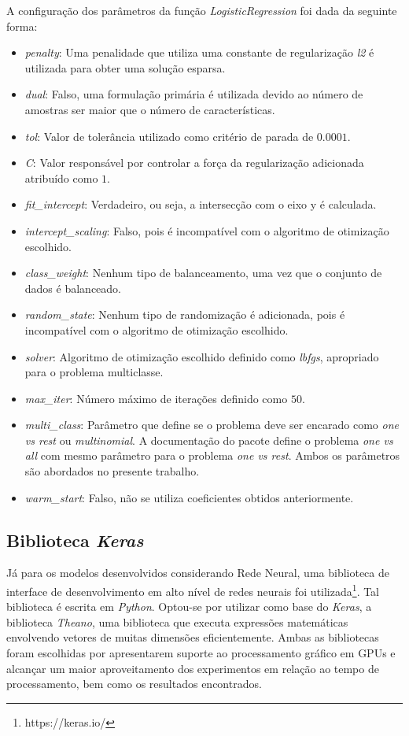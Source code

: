 \documentclass[conference]{IEEEtran}
\begin{document}
A configuração dos parâmetros da função \emph{LogisticRegression} foi dada da seguinte forma:
\begin{itemize}
	\item \textit{penalty}: Uma penalidade que utiliza uma constante de regularização \textit{l2} é utilizada para obter uma solução esparsa.
	\item \textit{dual}: Falso, uma formulação primária é utilizada devido ao número de amostras ser maior que o número de características.
	\item \textit{tol}: Valor de tolerância utilizado como critério de parada de $0.0001$.
	\item \textit{C}: Valor responsável por controlar a força da regularização adicionada atribuído como $1$.
	\item \textit{fit\_intercept}: Verdadeiro, ou seja, a intersecção com o eixo y é calculada.
	\item \textit{intercept\_scaling}: Falso, pois é incompatível com o algoritmo de otimização escolhido.
	\item \textit{class\_weight}: Nenhum tipo de balanceamento, uma vez que o conjunto de dados é balanceado.
	\item \textit{random\_state}: Nenhum tipo de randomização é adicionada, pois é incompatível com o algoritmo de otimização escolhido.
	\item \textit{solver}: Algoritmo de otimização escolhido definido como \textit{lbfgs}, apropriado para o problema multiclasse.
	\item \textit{max\_iter}: Número máximo de iterações definido como $50$.
	\item \textit{multi\_class}: Parâmetro que define se o problema deve ser encarado como \textit{one vs rest} ou \textit{multinomial}. A documentação do pacote define o problema \textit{one vs all} com mesmo parâmetro para o problema \textit{one vs rest}. Ambos os parâmetros são abordados no presente trabalho. 
	\item \textit{warm\_start}: Falso, não se utiliza coeficientes obtidos anteriormente.
\end{itemize}


\subsection{Biblioteca \textit{Keras}} \label{sec:bib}

Já para os modelos desenvolvidos considerando Rede Neural, uma biblioteca de interface de desenvolvimento em alto nível de redes neurais foi utilizada\footnote{https://keras.io/}. Tal biblioteca é escrita em \emph{Python}. Optou-se por utilizar como base do \textit{Keras}, a biblioteca \textit{Theano}, uma biblioteca que executa expressões matemáticas envolvendo vetores de muitas dimensões eficientemente. Ambas as bibliotecas foram escolhidas por apresentarem suporte ao processamento gráfico em GPUs e alcançar um maior aproveitamento dos experimentos em relação ao tempo de processamento, bem como os resultados encontrados.
\end{document}

